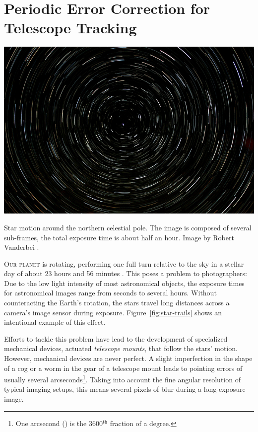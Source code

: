 \chapter{Periodic Error Correction for Telescope Tracking}
\label{ch:predictive-error-correction-for-telescopes}

\begin{marginfigure}[1.9\baselineskip]
\centering%
\footnotesize%
  \includegraphics[width=\columnwidth]{img/star_trails_small.jpg}%
  \caption[Star motion around the northern celestial pole.]{Star motion
around the northern celestial pole. The image is com\-po\-sed of se\-ve\-ral
sub-frames, the total exposure time is about half an hour. Image by Robert
Vanderbei .}
  \label{fig:star-trails}
\end{marginfigure}

\lettrine{O}{ur planet} is rotating, performing one full turn relative to the
sky in a stellar day of about 23 hours and 56 minutes
\cite[]{Allen:2000:Allen}. This poses a problem to photographers: Due to
the low light intensity of most astronomical objects, the exposure times for
astronomical images range from seconds to several hours. Without counteracting
the Earth's rotation, the stars travel long distances across a camera's image
sensor during exposure. Figure~\ref{fig:star-trails} shows an intentional
example of this effect.

Efforts to tackle this problem have lead to the development of specialized
mechanical devices, actuated \emph{telescope mounts}, that follow the stars'
motion. However, mechanical devices are never perfect. A slight imperfection in
the shape of a cog or a worm in the gear of a telescope mount leads to pointing
errors of usually several arcseconds\footnote[][3mm]{One arcsecond (\as) is the
3600$^\text{th}$ fraction of a degree.}. Taking into account the fine angular
resolution of typical imaging setups, this means several pixels of blur during a
long-exposure image.

